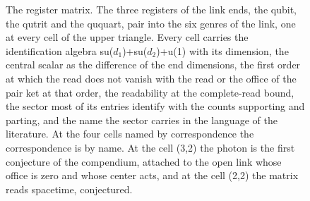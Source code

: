\begin{figure}[htbp]
\caption{The register matrix. The three registers of the link ends, the qubit, the qutrit and the ququart, pair into the six genres of the link, one at every cell of the upper triangle. Every cell carries the identification algebra su($d_1$)+su($d_2$)+u(1) with its dimension, the central scalar as the difference of the end dimensions, the first order at which the read does not vanish with the read or the office of the pair ket at that order, the readability at the complete-read bound, the sector most of its entries identify with the counts supporting and parting, and the name the sector carries in the language of the literature. At the four cells named by correspondence the correspondence is by name. At the cell (3,2) the photon is the first conjecture of the compendium, attached to the open link whose office is zero and whose center acts, and at the cell (2,2) the matrix reads spacetime, conjectured.}\label{fig:register-matrix}
\end{figure}

